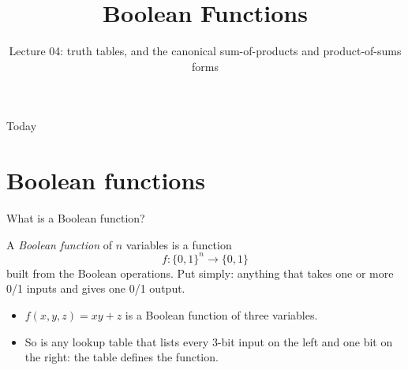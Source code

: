 \documentclass[10pt]{wosm-slides}
\title[Lecture 04 \textperiodcentered\ Boolean Functions]{Boolean Functions}
\subtitle{Lecture 04: truth tables, and the canonical sum-of-products and
  product-of-sums forms}
\begin{document}
\maketitle

\begin{frame}{Today}
  \tableofcontents
\end{frame}

\section{Boolean functions}

\begin{frame}{What is a Boolean function?}
  \begin{definition}
    A \emph{Boolean function} of $n$ variables is a function
    \[ f : \{0, 1\}^n \to \{0, 1\} \]
    built from the Boolean operations. Put simply: anything that takes one or more
    0/1 inputs and gives one 0/1 output.
  \end{definition}

  \medskip
  \begin{itemize}
    \item $f(x, y, z) = xy + z$ is a Boolean function of three variables.
    \item So is any lookup table that lists every 3-bit input on the left and one
      bit on the right: the table defines the function.
  \end{itemize}
\end{frame}
\end{document}
